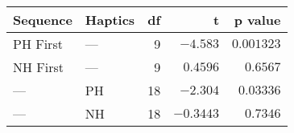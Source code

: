 \begin{tabular}{llrrr}
\toprule
 Sequence & Haptics &  df &         t &    p value \\
\midrule
 PH First &     --- &   9 &  $-4.583$ & $0.001323$ \\
 NH First &     --- &   9 &  $0.4596$ &   $0.6567$ \\
      --- &      PH &  18 &  $-2.304$ &  $0.03336$ \\
      --- &      NH &  18 & $-0.3443$ &   $0.7346$ \\
\bottomrule
\end{tabular}
